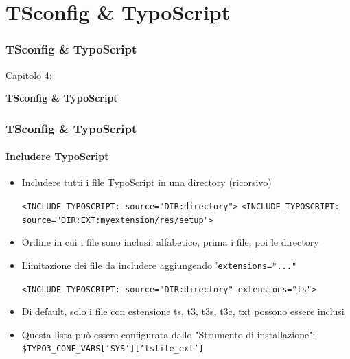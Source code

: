 %

\section{TSconfig \& TypoScript}
\begin{frame}[fragile]
	\frametitle{TSconfig \& TypoScript}

	\begin{center}\huge{Capitolo 4:}\end{center}
	\begin{center}\huge{\color{typo3darkgrey}\textbf{TSconfig \& TypoScript}}\end{center}

\end{frame}


\begin{frame}[fragile]
	\frametitle{TSconfig \& TypoScript}
	\framesubtitle{Includere TypoScript}

	\begin{itemize}
		\item Includere tutti i file TypoScript in una directory (ricorsivo)

			\lstinline!<INCLUDE_TYPOSCRIPT: source="DIR:directory">!
			\lstinline!<INCLUDE_TYPOSCRIPT: source="DIR:EXT:myextension/res/setup">!

		\item Ordine in cui i file sono inclusi:\newline
			alfabetico, prima i file, poi le directory
		\item Limitazione dei file da includere aggiungendo '\texttt{extensions="..."}

			\lstinline!<INCLUDE_TYPOSCRIPT: source="DIR:directory" extensions="ts">!

		\item Di default, solo i file con estensione ts, t3, t3s, t3c, txt possono essere inclusi
		\item Questa lista può essere configurata dallo "Strumento di installazione":\newline
			\texttt{\$TYPO3\_CONF\_VARS['SYS']['tsfile\_ext']}
	\end{itemize}

\end{frame}

